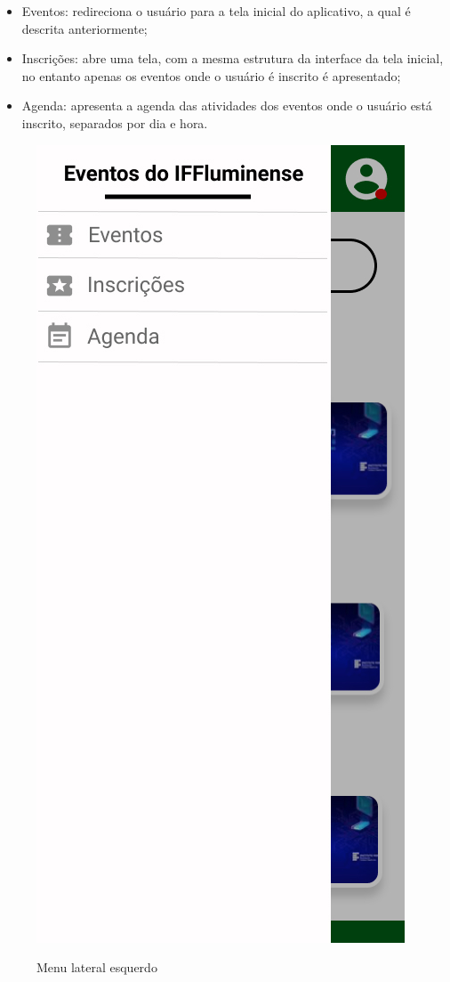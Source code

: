 \begin{itemize}
    \item Eventos: redireciona o usuário para a tela inicial do aplicativo, a qual é descrita anteriormente;
    \item Inscrições: abre uma tela, com a mesma estrutura da interface da tela inicial, no entanto apenas os eventos onde o usuário é inscrito é apresentado;
    \item Agenda: apresenta a agenda das atividades dos eventos onde o usuário está inscrito, separados por dia e hora.
\end{itemize}

\begin{figure}[H]
    \centering
    \caption{Menu lateral esquerdo}
    \includegraphics[scale=0.44]{figuras/Audiencia/3-MenuEsquerdo.jpg}
    \label{fig:audiencia3}
\end{figure}

